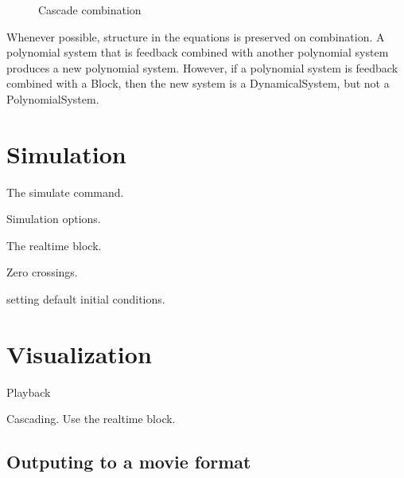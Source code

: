 \begin{figure}[h]
\begin{center}
\end{center}
\caption{Cascade combination}
\end{figure}

Whenever possible, structure in the equations is preserved on
combination.  A polynomial system that is feedback combined with
another polynomial system produces a new polynomial system.   However,
if a polynomial system is feedback combined with a \simulink Block,
then the new system is a DynamicalSystem, but not a PolynomialSystem.  

\section{Simulation}

The simulate command.

Simulation options.  

The realtime block.

Zero crossings.

setting default initial conditions.

\section{Visualization}

Playback

Cascading.   Use the realtime block.

\subsection{Outputing to a movie format}
